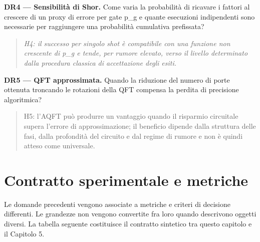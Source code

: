 \textbf{DR4 --- Sensibilità di Shor.} Come varia la probabilità di ricavare i fattori al crescere di un proxy di errore per gate p\_g e quante esecuzioni indipendenti sono necessarie per raggiungere una probabilità cumulativa prefissata?

\begin{quote}
\emph{H4: il successo per singolo shot è compatibile con una funzione non crescente di p\_g e tende, per rumore elevato, verso il livello determinato dalla procedura classica di accettazione degli esiti.}
\end{quote}

\textbf{DR5 --- QFT approssimata.} Quando la riduzione del numero di porte ottenuta troncando le rotazioni della QFT compensa la perdita di precisione algoritmica?

\begin{quote}
H5: l'AQFT può produrre un vantaggio quando il risparmio circuitale supera l'errore di approssimazione; il beneficio dipende dalla struttura delle fasi, dalla profondità del circuito e dal regime di rumore e non è quindi atteso come universale. \cite{barencoAQFT1996,akoramurthy2026}
\end{quote}

\section{Contratto sperimentale e metriche}\label{sec:finale_2_5}\label{sec:metriche}

Le domande precedenti vengono associate a metriche e criteri di decisione differenti. Le grandezze non vengono convertite fra loro quando descrivono oggetti diversi. La tabella seguente costituisce il contratto sintetico tra questo capitolo e il Capitolo 5.

